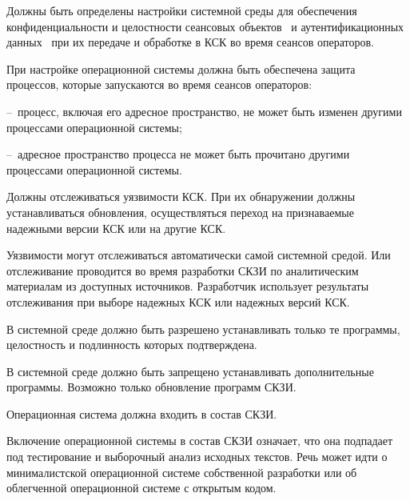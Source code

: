 \label{R.ES.Session}
Должны быть определены настройки системной среды
для обеспечения конфиденциальности и целостности сеансовых 
объектов~ и аутентификационных 
данных~ при их передаче и  
обработке в КСК во время сеансов операторов.

\begin{note}
При настройке операционной системы должна быть обеспечена защита 
процессов, которые запускаются во время сеансов операторов:

--~процесс, включая его адресное пространство, не может быть 
изменен другими процессами операционной системы;

--~адресное пространство процесса не может быть прочитано другими процессами 
операционной системы.
\end{note}

\label{R.ES.CVE}
Должны отслеживаться уязвимости КСК. При их обнаружении должны 
устанавливаться обновления, осуществляться переход на признаваемые надежными
версии КСК или на другие КСК.

\begin{note}
Уязвимости могут отслеживаться автоматически самой системной средой.
Или отслеживание проводится во время разработки СКЗИ по аналитическим
материалам из доступных источников. Разработчик использует результаты
отслеживания при выборе надежных КСК или надежных версий КСК.
\end{note}

\label{R.ES.AuthCode}
В системной среде должно быть разрешено устанавливать только те программы,
целостность и подлинность которых подтверждена.


\label{R.ES.NoCode}
В системной среде должно быть запрещено устанавливать дополнительные программы.
Возможно только обновление программ СКЗИ.

\label{R.ES.OS}
Операционная система должна входить в состав СКЗИ.

\begin{note}
Включение операционной системы в состав СКЗИ означает, что она подпадает под  
тестирование и выборочный анализ исходных текстов. Речь может идти 
о минималистской операционной системе собственной разработки или 
об облегченной операционной системе с открытым кодом.
\end{note}

